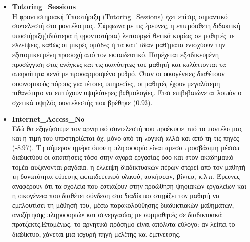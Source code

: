 \documentclass[12pt]{article}
\begin{document}
\begin{itemize}
\item \textbf{Tutoring\_{Sessions}}\\
Η φροντιστηριακή Υποστήριξη (Tutoring\_{Sessions}) έχει επίσης σημαντικό συντελεστή στο μοντέλο μας. Σύμφωνα με τις έρευνες, η επιπρόσθετη διδακτική υποστήριξη(ιδιάιτερα ή φροντιστήρια) 
λειτουργεί θετικά κυρίως σε μαθητές με ελλείψεις, καθώς οι μικρές ομάδες ή τα κατ’ ιδίαν μαθήματα ενισχύουν την εξατομικευμένη προσοχή από τον εκπαιδευτικό. Παρέχεται εξειδικευμένη προσέγγιση 
στις ανάγκες και τις ικανότητες του μαθητή και καλύπτονται τα απαραίτητα κενά με προσαρμοσμένο ρυθμό.  Όταν οι οικογένειες διαθέτουν οικονομικούς πόρους για τέτοιες υπηρεσίες, οι μαθητές έχουν 
μεγαλύτερη πιθανότητα να επιτύχουν υψηλότερες βαθμολογίες. Έτσι επιβεβαιώνεται λοιπόν ο σχετικά υψηλός συντελεστής που βρέθηκε (0.93).

\item \textbf{Internet\_{Access}\_{No}}\\
Εδώ θα εξηγήσουμε τον αρνητικό συντελεστή που προέκυψε από το μοντέλο μας και η τιμή του υποστηρίζεται όχι μόνο από τη λογική αλλά και από τη τις πηγές (-8.97). Τη σήμερον ημέρα όπου η πληροφορία
είναι άμεσα προσβάσιμη μέσσω διαδικτύου οι απαιτήσεις τόσο στην αγορά εργασίας όσο και στον ακαδημαικό τομέα αυξάνονται ραγδαία. η έλλειψη διαδικτυακών πόρων στερεί από τον μαθητή τη δυνατότητα 
εύρεσης εκπαιδευτικού υλικού, ασκήσεων, βίντεο, κ.λ.π. Έρευνες αναφέρουν ότι  τα σχολεία που εστιάζουν στην προώθηση ψηφιακών εργαλείων και η οικογένεια που διαθέτει σύνδεση στο διαδίκτυο στηρίζει 
τον μαθητή να εμπλουτίσει τη μάθησή του, μέσω παρακολούθησης διαδυκτιακών μαθημάτων, αναζήτησης πληροφοριών και συνεργασίας με συμμαθητές σε διαδικτυακά προτζεκτς.Επομένως, το αρνητικό πρόσημο είναι 
απόλυτα εύλογο: αν λείπει το διαδίκτυο, χάνεται μια ισχυρή πηγή μελέτης και έμπνευσης.


\end{itemize}
\end{document}
